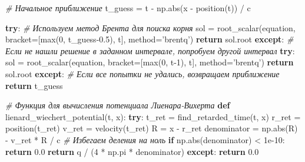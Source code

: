 \documentclass[11pt]{article}
\newenvironment{Shaded}{}{}
\newcommand{\KeywordTok}[1]{\textcolor[rgb]{0.00,0.44,0.13}{\textbf{{#1}}}}
\newcommand{\DecValTok}[1]{\textcolor[rgb]{0.25,0.63,0.44}{{#1}}}
\newcommand{\FloatTok}[1]{\textcolor[rgb]{0.25,0.63,0.44}{{#1}}}
\newcommand{\StringTok}[1]{\textcolor[rgb]{0.25,0.44,0.63}{{#1}}}
\newcommand{\CommentTok}[1]{\textcolor[rgb]{0.38,0.63,0.69}{\textit{{#1}}}}
\newcommand{\NormalTok}[1]{{#1}}
\newcommand{\ControlFlowTok}[1]{\textcolor[rgb]{0.00,0.44,0.13}{\textbf{{#1}}}}
\newcommand{\OperatorTok}[1]{\textcolor[rgb]{0.40,0.40,0.40}{{#1}}}
\newcommand{\BuiltInTok}[1]{{#1}}
\begin{document}
\begin{Shaded}
\begin{Highlighting}[]
    \CommentTok{# Начальное приближение}
\NormalTok{    t_guess }\OperatorTok{=}\NormalTok{ t }\OperatorTok{-}\NormalTok{ np.}\BuiltInTok{abs}\NormalTok{(x }\OperatorTok{-}\NormalTok{ position(t)) }\OperatorTok{/}\NormalTok{ c}

    \ControlFlowTok{try}\NormalTok{:}
        \CommentTok{# Используем метод Брента для поиска корня}
\NormalTok{        sol }\OperatorTok{=}\NormalTok{ root_scalar(equation, bracket}\OperatorTok{=}\NormalTok{[}\BuiltInTok{max}\NormalTok{(}\DecValTok{0}\NormalTok{, t_guess}\FloatTok{-0.5}\NormalTok{), t], method}\OperatorTok{=}\StringTok{'brentq'}\NormalTok{)}
        \ControlFlowTok{return}\NormalTok{ sol.root}
    \ControlFlowTok{except}\NormalTok{:}
        \CommentTok{# Если не нашли решение в заданном интервале, попробуем другой интервал}
        \ControlFlowTok{try}\NormalTok{:}
\NormalTok{            sol }\OperatorTok{=}\NormalTok{ root_scalar(equation, bracket}\OperatorTok{=}\NormalTok{[}\BuiltInTok{max}\NormalTok{(}\DecValTok{0}\NormalTok{, t}\DecValTok{-1}\NormalTok{), t], method}\OperatorTok{=}\StringTok{'brentq'}\NormalTok{)}
            \ControlFlowTok{return}\NormalTok{ sol.root}
        \ControlFlowTok{except}\NormalTok{:}
            \CommentTok{# Если все попытки не удались, возвращаем приближение}
            \ControlFlowTok{return}\NormalTok{ t_guess}

\CommentTok{# Функция для вычисления потенциала Лиенара-Вихерта}
\KeywordTok{def}\NormalTok{ lienard_wiechert_potential(t, x):}
    \ControlFlowTok{try}\NormalTok{:}
\NormalTok{        t_ret }\OperatorTok{=}\NormalTok{ find_retarded_time(t, x)}
\NormalTok{        r_ret }\OperatorTok{=}\NormalTok{ position(t_ret)}
\NormalTok{        v_ret }\OperatorTok{=}\NormalTok{ velocity(t_ret)}
\NormalTok{        R }\OperatorTok{=}\NormalTok{ x }\OperatorTok{-}\NormalTok{ r_ret}
\NormalTok{        denominator }\OperatorTok{=}\NormalTok{ np.}\BuiltInTok{abs}\NormalTok{(R) }\OperatorTok{-}\NormalTok{ v_ret }\OperatorTok{*}\NormalTok{ R }\OperatorTok{/}\NormalTok{ c}
        \CommentTok{# Избегаем деления на ноль}
        \ControlFlowTok{if}\NormalTok{ np.}\BuiltInTok{abs}\NormalTok{(denominator) }\OperatorTok{<} \FloatTok{1e-10}\NormalTok{:}
            \ControlFlowTok{return} \FloatTok{0.0}
        \ControlFlowTok{return}\NormalTok{ q }\OperatorTok{/}\NormalTok{ (}\DecValTok{4} \OperatorTok{*}\NormalTok{ np.pi }\OperatorTok{*}\NormalTok{ denominator)}
    \ControlFlowTok{except}\NormalTok{:}
        \ControlFlowTok{return} \FloatTok{0.0}


\end{Highlighting}
\end{Shaded}
\end{document}
